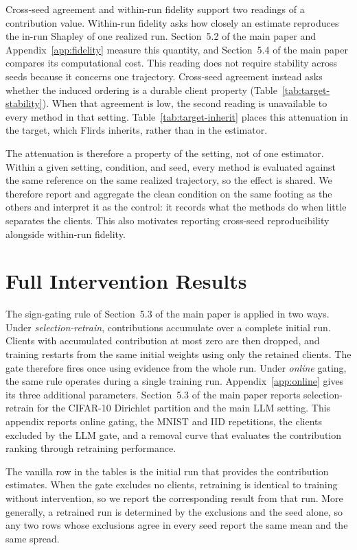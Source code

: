 \documentclass[letterpaper]{article} %
\theoremstyle{definition}
\begin{document}
Cross-seed agreement and within-run fidelity support two readings of a
contribution value. Within-run fidelity asks how closely an estimate
reproduces the in-run Shapley of one realized run. Section~5.2 of the main paper
and Appendix~\ref{app:fidelity} measure this quantity, and
Section~5.4 of the main paper
compares its computational cost. This reading does not require stability
across seeds because it concerns one trajectory. Cross-seed agreement instead
asks whether the induced ordering is a durable client property
(Table~\ref{tab:target-stability}). When that agreement is low, the second
reading is unavailable to every method in that setting.
Table~\ref{tab:target-inherit} places this attenuation in the target, which
Flirds inherits, rather than in the estimator.

The attenuation is therefore a property of the setting, not of one estimator.
Within a given setting, condition, and seed, every method is evaluated against
the same reference on the same realized trajectory, so the effect is shared. We therefore
report and aggregate the clean condition on the same footing as the others and
interpret it as the control: it records what the methods do when little
separates the clients. This also motivates reporting cross-seed reproducibility
alongside within-run fidelity.


\section{Full Intervention Results}
\label{app:intervention}

The sign-gating rule of Section~5.3 of the main paper is applied in two ways.
Under \emph{selection-retrain}, contributions accumulate over a complete
initial run. Clients with accumulated contribution at most zero are then
dropped, and training restarts from the same initial weights using only the
retained clients. The gate therefore fires once using evidence from the whole
run. Under \emph{online} gating, the same rule operates during a single
training run. Appendix~\ref{app:online} gives its three additional parameters.
Section~5.3 of the main paper reports selection-retrain for the CIFAR-10
Dirichlet partition and the main LLM setting.
This appendix reports online gating, the MNIST and IID
repetitions, the clients excluded by the LLM gate, and a removal curve that
evaluates the contribution ranking through retraining performance.

The vanilla row in the tables is the initial run that provides the
contribution estimates. When the gate excludes no clients, retraining is
identical to training without intervention, so we report the corresponding
result from that run. More generally, a retrained run is determined by the
exclusions and the seed alone, so any two rows whose exclusions agree in
every seed report the same mean and the same spread.
\end{document}
